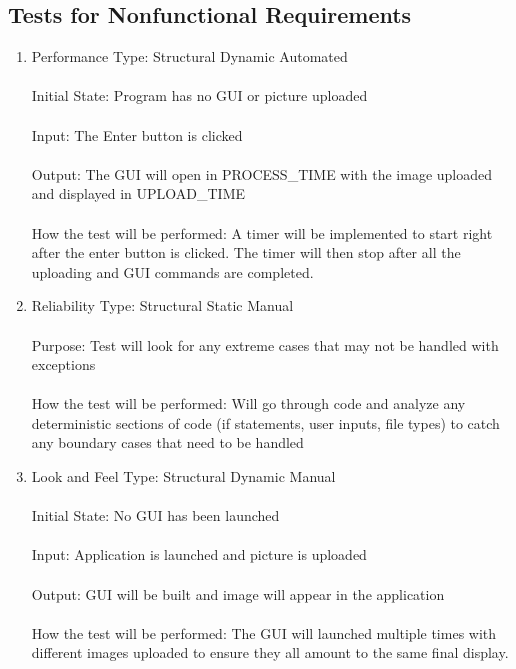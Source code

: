 \documentclass[12pt, titlepage]{article}
\begin{document}
\subsection{Tests for Nonfunctional Requirements}

\begin{enumerate}

\item{Performance}
Type: Structural Dynamic Automated \\ \\
Initial State: Program has no GUI or picture uploaded\\ \\
Input: The Enter button is clicked\\ \\
Output: The GUI will open in PROCESS\_TIME with the image uploaded and displayed in UPLOAD\_TIME \\ \\
How the test will be performed: A timer will be implemented to start right after the enter button is clicked. The timer will then stop after all the uploading and GUI commands are completed.

\item{Reliability}
Type: Structural Static Manual\\ \\
Purpose: Test will look for any extreme cases that may not be handled with exceptions\\ \\
How the test will be performed: Will go through code and analyze any deterministic sections of code (if statements, user inputs, file types) to catch any boundary cases that need to be handled

\item{Look and Feel}
Type: Structural Dynamic Manual\\ \\
Initial State: No GUI has been launched \\ \\
Input: Application is launched and picture is uploaded\\ \\
Output: GUI will be built and image will appear in the application\\ \\
How the test will be performed: The GUI will launched multiple times with different images uploaded to ensure they all amount to the same final display.


\end{enumerate}
\end{document}
